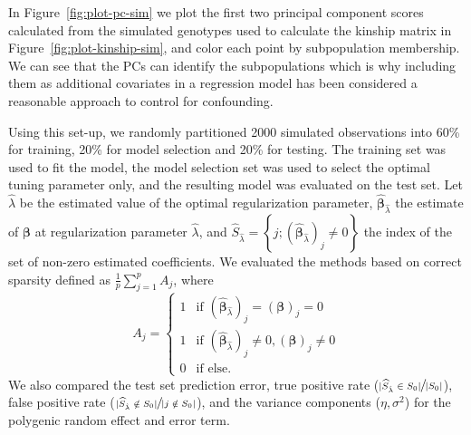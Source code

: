 \documentclass[12pt,letter]{article}\usepackage[]{graphicx}\usepackage[]{color}
\makeatletter
\newcommand{\tm}[1]{\textrm{{#1}}}
\newcommand{\bX}{\textbf{X}}
\newcommand{\bY}{\textbf{Y}}
\newcommand{\bbeta}{\boldsymbol{\beta}}
\DeclarePairedDelimiter\norm{\lVert}{\rVert}%
\let\oldnorm\norm
\def\norm{\@ifstar{\oldnorm}{\oldnorm*}}
\makeatother
\begin{document}
In Figure~\ref{fig:plot-pc-sim} we plot the first two principal component scores calculated from the simulated genotypes used to calculate the kinship matrix in Figure~\ref{fig:plot-kinship-sim}, and color each point by subpopulation membership. We can see that the PCs can identify the subpopulations which is why including them as additional covariates in a regression model has been considered a reasonable approach to control for confounding.



Using this set-up, we randomly partitioned 2000 simulated observations into 60\% for training, 20\% for model selection and 20\% for testing. The training set was used to fit the model, the model selection set was used to select the optimal tuning parameter only, and the resulting model was evaluated on the test set. Let $\hat{\lambda}$ be the estimated value of the optimal regularization parameter, $\widehat{\bbeta}_{\hat{\lambda}}$ the estimate of $\bbeta$ at regularization parameter $\hat{\lambda}$, and $\widehat{S}_{\hat{\lambda}} = \left\lbrace j; (\widehat{\bbeta}_{\hat{\lambda}})_j \neq 0 \right\rbrace$ the index of the set of non-zero estimated coefficients. We evaluated the methods based on correct sparsity defined as $\frac{1}{p} \sum_{j=1}^{p} A_j$, where
$$A_j = \begin{cases}
1 & \tm{if } (\widehat{\bbeta}_{\hat{\lambda}})_j= (\bbeta)_j = 0\\
1 & \tm{if } (\widehat{\bbeta}_{\hat{\lambda}})_j \neq 0, (\bbeta)_j \neq 0\\
0 & \tm{if } \tm{else}.
\end{cases}$$ We also compared the test set prediction error, true positive rate ($\sfrac{|\widehat{S}_{\hat{\lambda}} \in  S_0|}{|S_0|}$), false positive rate ($\sfrac{|\widehat{S}_{\hat{\lambda}} \notin S_0|}{|j \notin S_0|}$), and the variance components ($\eta, \sigma^2$) for the polygenic random effect and error term. %

\end{document}
